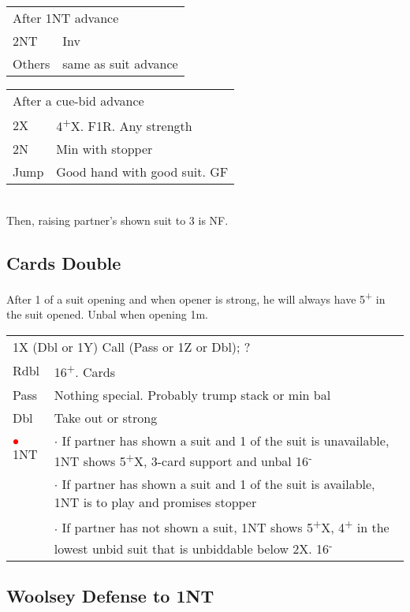 \documentclass{article}
\newcommand{\nt}{\relsize{-1}NT\relsize{1}}
\newcommand{\up}{\textsuperscript{+}}
\newcommand{\down}{\textsuperscript{-}}
\newcommand{\al}{\textcolor{red}{$\bullet$}}
\begin{document}
\medskip

\begin{tabular}{|l|p{6.5cm}}
	\multicolumn{2}{l}{After 1\nt{} advance} \\
  2\nt{} & Inv \\
	Others & same as suit advance \\
\end{tabular}

\medskip

\begin{tabular}{|l|p{6.5cm}}
	\multicolumn{2}{l}{After a cue-bid advance} \\
  2X & 4\up{}X. F1R. Any strength \\
	2N & Min with stopper \\
	Jump & Good hand with good suit. GF \\
\end{tabular}\\
Then, raising partner's shown suit to 3 is NF.

\subsection{Cards Double}
After 1 of a suit opening and when opener is strong, he will always have 5\up{} in the suit opened. Unbal when opening 1m. \\

\begin{tabular}{|l|p{6.5cm}}
	\multicolumn{2}{l}{1X (Dbl or 1Y) Call (Pass or 1Z or Dbl); ?} \\
	Rdbl & 16\up{}. Cards \\
	Pass & Nothing special. Probably trump stack or min bal \\
	Dbl & Take out or strong \\
	\al{}1\nt{} &  $\cdot$ If partner has shown a suit and 1 of the suit is unavailable, 1\nt{} shows 5\up{}X, 3-card support and unbal 16\down{} \\
	 &  $\cdot$ If partner has shown a suit and 1 of the suit is available, 1\nt{} is to play and promises stopper \\
	 &  $\cdot$ If partner has not shown a suit, 1\nt{} shows 5\up{}X, 4\up{} in the lowest unbid suit that is unbiddable below 2X. 16\down{} \\
\end{tabular}

\subsection{Woolsey Defense to 1\nt{}}
\end{document}
